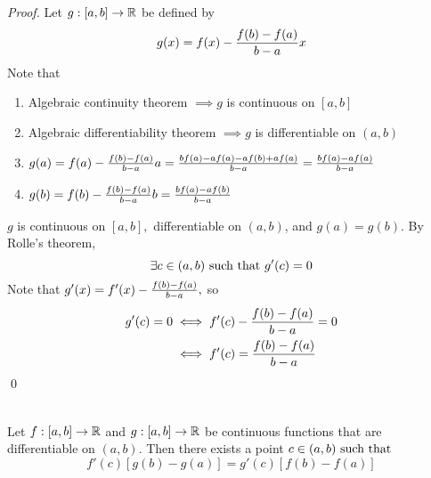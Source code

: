 \begin{proof}
    Let $g:[a,b] \to \mathbb{R}$ be defined by 
    $$
    g(x) = f(x) - \frac{f(b) - f(a)}{b - a}x
    $$
    Note that
    \begin{enumerate}[$*)$]
        \item Algebraic continuity theorem $\implies g$ is continuous on $[a,b]$
        \item Algebraic differentiability theorem $\implies g$ is differentiable on $(a,b)$
        \item $g(a) = f(a) - \frac{f(b) - f(a)}{b - a}a = \frac{bf(a)-af(a)-af(b)+af(a)}{b-a} = \frac{bf(a) - af(a)}{b - a}$
        \item $g(b) = f(b) - \frac{f(b) - f(a)}{b - a}b = \frac{bf(a) - af(b)}{b - a}$
    \end{enumerate}
    $g$ is continuous on $[a,b],$ differentiable on $(a,b)$, and $g(a) = g(b)$. By Rolle's theorem,
    $$
    \exists c \in (a,b) \text{ such that } g'(c) = 0
    $$
    Note that $g'(x) = f'(x) - \frac{f(b) - f(a)}{b - a},$ so 
    \begin{align*}
        g'(c) = 0 &\iff f'(c) - \frac{f(b) - f(a)}{b - a} = 0 \\
        &\iff f'(c) = \frac{f(b) - f(a)}{b - a}
    \end{align*}
    \qed
\end{proof}

\begin{theorem}\leavevmode\\
    \label{Thm5.10}
    Let $f:[a,b] \to \mathbb{R}$ and $g:[a,b] \to \mathbb{R}$ be continuous functions that are differentiable on $(a,b)$. Then there exists a point $c\in(a,b) \text{ such that } $
    $$
    f'(c)\left[g(b) - g(a)\right] = g'(c) \left[f(b) - f(a)\right]
    $$
\end{theorem}

